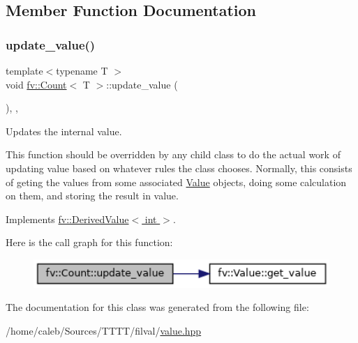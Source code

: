 \subsection{Member Function Documentation}
\hypertarget{classfv_1_1Count_afff1c16a8747a82db1cc1c8248c56a08}{}\label{classfv_1_1Count_afff1c16a8747a82db1cc1c8248c56a08} 
\subsubsection{\texorpdfstring{update\+\_\+value()}{update\_value()}}
{\footnotesize\ttfamily template$<$typename T $>$ \\
void \hyperlink{classfv_1_1Count}{fv\+::\+Count}$<$ T $>$\+::update\+\_\+value (\begin{DoxyParamCaption}{ }\end{DoxyParamCaption})\hspace{0.3cm}{\ttfamily [inline]}, {\ttfamily [private]}, {\ttfamily [virtual]}}



Updates the internal value. 

This function should be overridden by any child class to do the actual work of updating value based on whatever rules the class chooses. Normally, this consists of geting the values from some associated \hyperlink{classfv_1_1Value}{Value} objects, doing some calculation on them, and storing the result in value. 

Implements \hyperlink{classfv_1_1DerivedValue_ae59e80a98eb74b95d8961bfe12ee5ec2}{fv\+::\+Derived\+Value$<$ int $>$}.

Here is the call graph for this function\+:
\nopagebreak
\begin{figure}[H]
\begin{center}
\leavevmode
\includegraphics[width=350pt]{classfv_1_1Count_afff1c16a8747a82db1cc1c8248c56a08_cgraph}
\end{center}
\end{figure}


The documentation for this class was generated from the following file\+:\begin{DoxyCompactItemize}
\item 
/home/caleb/\+Sources/\+T\+T\+T\+T/filval/\hyperlink{value_8hpp}{value.\+hpp}\end{DoxyCompactItemize}
